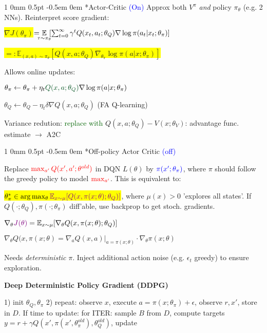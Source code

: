 \documentclass[11pt,landscape,a4paper,fleqn]{article}
\makeatletter
\newcommand*{\rsection}{%
	\@startsection{section}%
	{1}%
	{0mm}%
	{0.5pt}%
	{-0.5em \@plus 0em}
	{\color{myorange}\sffamily\small\bfseries}}
\newcommand{\mhl}[1]{\setlength{\fboxsep}{0pt}\colorbox{yellow}{#1}}
\makeatother
\begin{document}
\begin{multicols*}{4}
\rsection*{Actor-Critic} \textcolor{blue}{(On)} Approx both $V^\pi$ \textit{and} policy $\pi_\theta$ (e.g. 2 NNs). Reinterpret score gradient:

\mhl{$\nabla J(\theta_\pi)$}$= \hspace*{-2mm} \underset{\tau \sim \pi_\theta}{\mathbb{E}} \hspace*{-1mm} [\sum_{t=0}^\infty \gamma^t Q(x_t, a_t; \theta_Q) \nabla \log \pi(a_t | x_t; \theta_\pi)]$


\mhl{$ =: \mathbb{E}_{(x,a) \sim \pi_\theta} [Q(x,a;\theta_Q) \nabla_{\theta_\pi} \log \pi(a | x; \theta_\pi)]$}

Allows online updates:

$\theta_\pi \leftarrow \theta_\pi + \eta_t \textcolor{darkgreen}{Q(x,a;\theta_Q)} \nabla \log \pi(a | x; \theta_\pi)$

$\theta_Q \leftarrow \theta_Q  - \eta_t \delta \nabla Q(x,a;\theta_Q)$ (FA Q-learning)

Variance redution: \textcolor{darkgreen}{replace with} $Q(x,a;\theta_Q) - V(x; \theta_V)$: advantage func. estimate $\rightarrow$ A2C

\rsection*{Off-policy Actor Critic} \textcolor{blue}{(off)}

Replace $\textcolor{red}{\max_{a'} Q(x', a'; \theta^{old})}$ in DQN $L(\theta)$ by $\textcolor{blue}{\pi(x'; \theta_\pi)}$, where $\pi$ should follow the greedy policy to model $\textcolor{red}{\max_{a'}}$. This is equivalent to:

\mhl{$\theta_\pi^* \in \arg\max_\theta \textcolor{violet}{\mathbb{E}_{x \sim \mu} [Q(x,\pi(x;\theta); \theta_Q)]}$},
where $\mu(x) > 0$ 'explores all states'. If $Q(\cdot; \theta_Q), \pi(\cdot; \theta_\pi)$ diff'able, use backprop to get stoch. gradients.

$\nabla_\theta \textcolor{violet}{J(\theta)} = \mathbb{E}_{x \sim \mu} [\nabla_\theta Q(x,\pi(x;\theta); \theta_Q)]$

$\nabla_{\theta} Q(x,\pi(x;\theta) = \nabla_a Q(x,a)|_{a = \pi(x;\theta)} \cdot \nabla_{\theta} \pi(x; \theta)$

Needs \textit{deterministic} $\pi$. Inject additional action noise (e.g. $\epsilon_t$ greedy) to ensure exploration.

{\fontsize{9.5}{6}\selectfont \textbf{Deep Deterministic Policy Gradient (DDPG)}}

1) init $\theta_Q, \theta_\pi$ 2) repeat: observe $x$, execute $a = \pi(x; \theta_\pi) + \epsilon$, observe $r,x'$, store in $D$. If time to update: for ITER: sample $B$ from $D$, compute targets
$y = r+ \gamma Q(x', \pi(x', \theta_\pi^{old}), \theta_Q^{old})$, update
\iffalse
do GD ($\theta_Q$)/ GA ($\theta_\pi$), update $\theta^{old} \leftarrow (1 - \rho) \theta^{old} + \rho \theta$
\fi


\end{multicols*}
\end{document}
